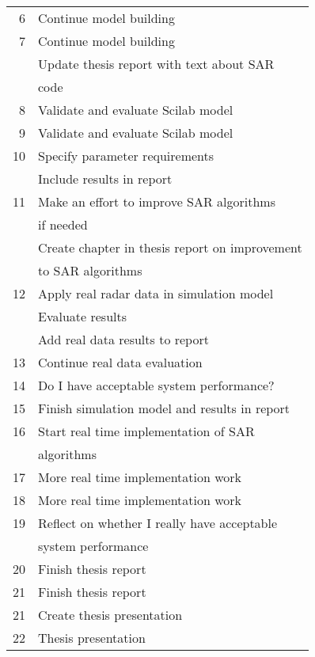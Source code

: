 \documentclass{chi2012}
\begin{document}
\begin{tabular}{rl}
         6 & Continue model building \\

         7 & Continue model building \\

           & Update thesis report with text about SAR\\& code\\

         8 & Validate and evaluate Scilab model \\

         9 & Validate and evaluate Scilab model \\

        10 & Specify parameter requirements \\

           & Include results in report \\

        11 & Make an effort to improve SAR algorithms\\& if needed\\

           & Create chapter in thesis report on improvement\\& to SAR algorithms \\

        12 & Apply real radar data in simulation model \\

           & Evaluate results \\

           & Add real data results to report \\

        13 & Continue real data evaluation \\

        14 & Do I have acceptable system performance? \\

        15 & Finish simulation model and results in report \\

        16 & Start real time implementation of SAR\\& algorithms \\

        17 & More real time implementation work \\

        18 & More real time implementation work \\

        19 & Reflect on whether I really have acceptable\\& system performance \\

        20 & Finish thesis report \\

        21 & Finish thesis report \\

        21 & Create thesis presentation \\

        22 & Thesis presentation \\

\bottomrule

\end{tabular}  



\end{document}

